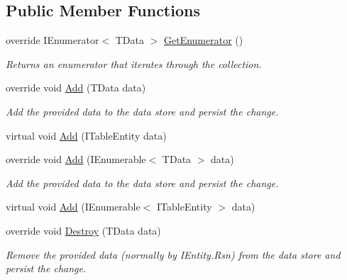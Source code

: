\subsection*{Public Member Functions}
\begin{DoxyCompactItemize}
\item 
override I\+Enumerator$<$ T\+Data $>$ \hyperlink{classCqrs_1_1Azure_1_1BlobStorage_1_1TableStorageStore_ac3e684b894e739f8936e537806952c49_ac3e684b894e739f8936e537806952c49}{Get\+Enumerator} ()
\begin{DoxyCompactList}\small\item\em Returns an enumerator that iterates through the collection. \end{DoxyCompactList}\item 
override void \hyperlink{classCqrs_1_1Azure_1_1BlobStorage_1_1TableStorageStore_ad9becfb4b149c645450deba342696e54_ad9becfb4b149c645450deba342696e54}{Add} (T\+Data data)
\begin{DoxyCompactList}\small\item\em Add the provided {\itshape data}  to the data store and persist the change. \end{DoxyCompactList}\item 
virtual void \hyperlink{classCqrs_1_1Azure_1_1BlobStorage_1_1TableStorageStore_aa8e6b41c32dd8f81d5ff852693e7979d_aa8e6b41c32dd8f81d5ff852693e7979d}{Add} (I\+Table\+Entity data)
\item 
override void \hyperlink{classCqrs_1_1Azure_1_1BlobStorage_1_1TableStorageStore_a2b10c02a19150d5a68e6dcb4810ea8a1_a2b10c02a19150d5a68e6dcb4810ea8a1}{Add} (I\+Enumerable$<$ T\+Data $>$ data)
\begin{DoxyCompactList}\small\item\em Add the provided {\itshape data}  to the data store and persist the change. \end{DoxyCompactList}\item 
virtual void \hyperlink{classCqrs_1_1Azure_1_1BlobStorage_1_1TableStorageStore_a120c6fbb947cf4d37f60335df0182008_a120c6fbb947cf4d37f60335df0182008}{Add} (I\+Enumerable$<$ I\+Table\+Entity $>$ data)
\item 
override void \hyperlink{classCqrs_1_1Azure_1_1BlobStorage_1_1TableStorageStore_a1ad02e710a3fe1d794d99db332c351dc_a1ad02e710a3fe1d794d99db332c351dc}{Destroy} (T\+Data data)
\begin{DoxyCompactList}\small\item\em Remove the provided {\itshape data}  (normally by I\+Entity.\+Rsn) from the data store and persist the change. \end{DoxyCompactList}\item 

\end{DoxyCompactItemize}

